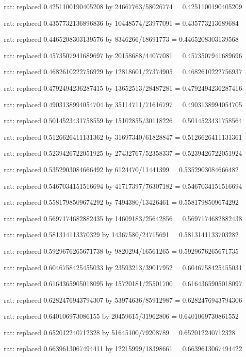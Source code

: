 \documentclass[a4paper,10pt]{article}
\begin{document}
\begin{eulernotebook}
\begin{eulercomment}
\begin{eulercomment}
\begin{eulercomment}
\begin{eulercomment}
\begin{eulercomment}
\begin{eulercomment}
\begin{eulercomment}
\begin{eulercomment}
\begin{eulercomment}
\begin{eulercomment}
\begin{eulercomment}
\begin{eulercomment}
\begin{eulercomment}
\begin{eulercomment}
\begin{eulercomment}
\begin{eulercomment}
\begin{euleroutput}
  rat: replaced 0.4251100190405208 by 24667763/58026774 = 0.4251100190405209
  
  rat: replaced 0.4357732136896836 by 10448574/23977091 = 0.435773213689684
  
  rat: replaced 0.4465208303139576 by 8346266/18691773 = 0.4465208303139568
  
  rat: replaced 0.4573507941689697 by 20158688/44077081 = 0.4573507941689696
  
  rat: replaced 0.4682610222756929 by 12818601/27374905 = 0.4682610222756937
  
  rat: replaced 0.4792494236287415 by 13652513/28487281 = 0.4792494236287416
  
  rat: replaced 0.4903138994054704 by 35114711/71616797 = 0.4903138994054705
  
  rat: replaced 0.5014523431758559 by 15102855/30118226 = 0.5014523431758564
  
  rat: replaced 0.5126626411131362 by 31697340/61828847 = 0.5126626411131361
  
  rat: replaced 0.5239426722051925 by 27432767/52358337 = 0.5239426722051924
  
  rat: replaced 0.5352903084666492 by 6124470/11441399 = 0.5352903084666482
  
  rat: replaced 0.5467034151516694 by 41717397/76307182 = 0.5467034151516694
  
  rat: replaced 0.5581798509674292 by 7494380/13426461 = 0.5581798509674292
  
  rat: replaced 0.5697174682882435 by 14609183/25642856 = 0.5697174682882438
  
  rat: replaced 0.581314113370329 by 14367580/24715691 = 0.5813141133703282
  
  rat: replaced 0.5929676265671738 by 9820294/16561265 = 0.5929676265671735
  
  rat: replaced 0.6046758425455033 by 23593213/39017952 = 0.6046758425455031
  
  rat: replaced 0.6164365905018095 by 15720181/25501700 = 0.6164365905018097
  
  rat: replaced 0.6282476943794307 by 53974636/85912987 = 0.6282476943794306
  
  rat: replaced 0.640106973086155 by 20459615/31962806 = 0.6401069730861552
  
  rat: replaced 0.652012240712328 by 51645100/79208789 = 0.652012240712328
  
  rat: replaced 0.6639613067494411 by 12215999/18398661 = 0.6639613067494422
  

\end{euleroutput}
\end{eulercomment}
\end{eulercomment}
\end{eulercomment}
\end{eulercomment}
\end{eulercomment}
\end{eulercomment}
\end{eulercomment}
\end{eulercomment}
\end{eulercomment}
\end{eulercomment}
\end{eulercomment}
\end{eulercomment}
\end{eulercomment}
\end{eulercomment}
\end{eulercomment}
\end{eulercomment}
\end{eulernotebook}
\end{document}

